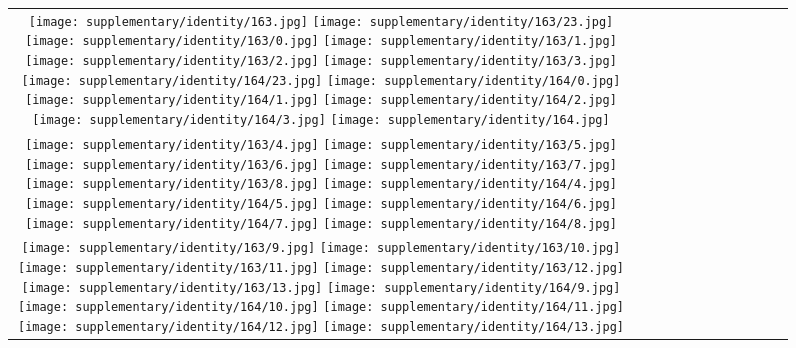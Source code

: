 \begin{figure*}[tb!]
    \centering
    \setlength{\tabcolsep}{0.5pt}
    {\small
    \renewcommand{\arraystretch}{0.5} 
    \begin{tabular}{c c c c c c c c c c c c }
    \captionsetup{type=figure, font=scriptsize}
  \texttt{[image: supplementary/identity/163.jpg]}
  \texttt{[image: supplementary/identity/163/23.jpg]}
  \texttt{[image: supplementary/identity/163/0.jpg]}
  \texttt{[image: supplementary/identity/163/1.jpg]}
  \texttt{[image: supplementary/identity/163/2.jpg]}
  \texttt{[image: supplementary/identity/163/3.jpg]}
    \hspace{5mm}
  \texttt{[image: supplementary/identity/164/23.jpg]}
  \texttt{[image: supplementary/identity/164/0.jpg]}
  \texttt{[image: supplementary/identity/164/1.jpg]}
  \texttt{[image: supplementary/identity/164/2.jpg]}
  \texttt{[image: supplementary/identity/164/3.jpg]}
  \texttt{[image: supplementary/identity/164.jpg]}

 \tabularnewline
  \texttt{[image: supplementary/identity/163/4.jpg]}
  \texttt{[image: supplementary/identity/163/5.jpg]}
  \texttt{[image: supplementary/identity/163/6.jpg]}
  \texttt{[image: supplementary/identity/163/7.jpg]}
  \texttt{[image: supplementary/identity/163/8.jpg]}
    \hspace{5mm}
  \texttt{[image: supplementary/identity/164/4.jpg]}
  \texttt{[image: supplementary/identity/164/5.jpg]}
  \texttt{[image: supplementary/identity/164/6.jpg]}
  \texttt{[image: supplementary/identity/164/7.jpg]}
  \texttt{[image: supplementary/identity/164/8.jpg]}
\tabularnewline
  \texttt{[image: supplementary/identity/163/9.jpg]}
  \texttt{[image: supplementary/identity/163/10.jpg]}
  \texttt{[image: supplementary/identity/163/11.jpg]}
  \texttt{[image: supplementary/identity/163/12.jpg]}
  \texttt{[image: supplementary/identity/163/13.jpg]}
    \hspace{5mm}
  \texttt{[image: supplementary/identity/164/9.jpg]}
  \texttt{[image: supplementary/identity/164/10.jpg]}
  \texttt{[image: supplementary/identity/164/11.jpg]}
  \texttt{[image: supplementary/identity/164/12.jpg]}
  \texttt{[image: supplementary/identity/164/13.jpg]}


\end{tabular}}
\end{figure*}
